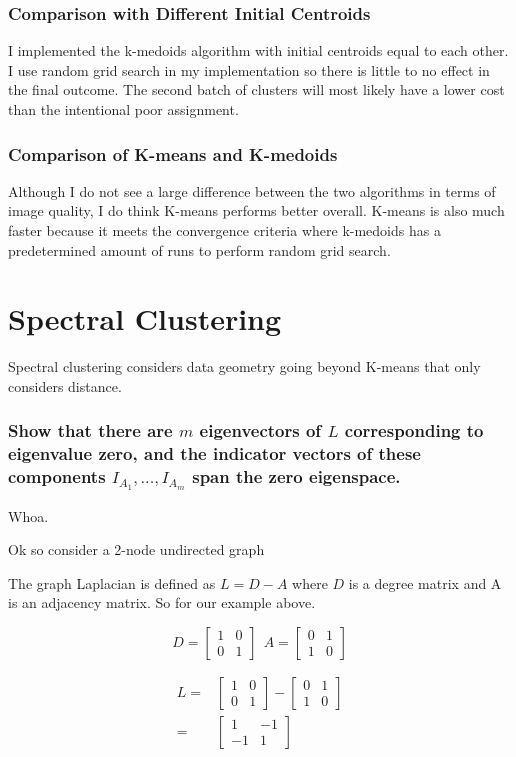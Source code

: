 \documentclass[a4paper]{article}
\begin{document}
\subsubsection{Comparison with Different Initial Centroids}
I implemented the k-medoids algorithm with initial centroids equal to each other.  I use random grid search in my implementation so there is little to no effect in the final outcome.  The second batch of clusters will most likely have a lower cost than the intentional poor assignment.
\subsubsection{Comparison of K-means and K-medoids}
Although I do not see a large difference between the two algorithms in terms of image quality, I do think K-means performs better overall.  K-means is also much faster because it meets the convergence criteria where k-medoids has a predetermined amount of runs to perform random grid search.

\section{Spectral Clustering}
Spectral clustering considers data geometry going beyond K-means that only considers distance.
\subsubsection{Show that there are $m$ eigenvectors of $L$ corresponding to eigenvalue zero, and the indicator vectors of these components $I_{A_1} , . . . , I_{A_m}$ span the zero eigenspace.}

Whoa.

Ok so consider a 2-node undirected graph

The graph Laplacian is defined as $L = D - A $ where $D$ is a degree matrix and A is an adjacency matrix.  So for our example above. 

$$
D = 
\begin{bmatrix} 
1 & 0 \\
0 & 1 
\end{bmatrix}\ \
A = 
\begin{bmatrix} 
0 & 1 \\
1 & 0 
\end{bmatrix}
$$



\begin{align}
L =& 
\begin{bmatrix} 
1 & 0 \\
0 & 1 
\end{bmatrix}
-
\begin{bmatrix} 
0 & 1 \\
1 & 0 
\end{bmatrix}\\
=&
\begin{bmatrix} 
1 & -1 \\
-1 & 1
\end{bmatrix}
\end{align}




\end{document}
